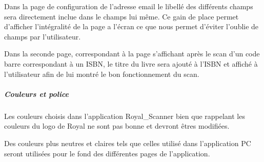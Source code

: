 \documentclass[etudiants]{support-iutrs}
\begin{document}
  \begin{figure}[htbp]
  \begin{center}
    \leavevmode
    \hspace{4cm}
  \end{center}
\end{figure}

Dans la page de configuration de l'adresse email le libellé des différents champs sera directement inclue dans le champs lui même.
Ce gain de place permet d'afficher l’intégralité de la page a l'écran ce que nous permet d'éviter l'oublie de champs par l'utilisateur.

Dans la seconde page, correspondant à la page s'affichant après le scan d'un code barre correspondant à un ISBN, le titre du livre sera ajouté à l'ISBN et affiché à l'utilisateur afin de lui montré le bon fonctionnement du scan. 

\subparagraph{Couleurs et police}
Les couleurs choisis dans l'application Royal\_Scanner bien que rappelant les couleurs du logo de Royal ne sont pas bonne et devront êtres modifiées.

Des couleurs plus neutres et claires tels que celles utilisé dans l'application PC seront utilisées pour le fond des différentes pages de l’application.
\end{document}
